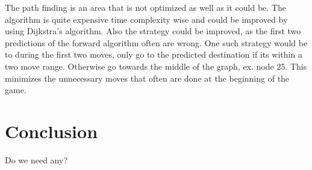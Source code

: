 \documentclass[12pt, a4paper]{article}
\begin{document}
The path finding is an area that is not optimized as well as it could be. The algorithm is quite expensive time complexity wise and could be improved by using Dijkstra's algorithm. Also the strategy could be improved, as the first two predictions of the forward algorithm often are wrong. One such strategy would be to during the first two moves, only go to the predicted destination if its within a two move range. Otherwise go towards the middle of the graph, ex. node 25. This minimizes the unnecessary moves that often are done at the beginning of the game.

\section{Conclusion}

Do we need any?
\end{document}

